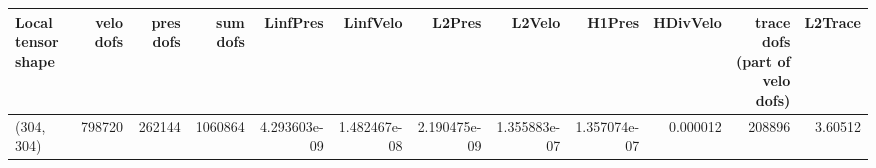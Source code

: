 \begin{tabular}{lrrrrrrrrrrr}
\toprule
Local tensor shape &  velo dofs &  pres dofs &  sum dofs &     LinfPres &     LinfVelo &       L2Pres &       L2Velo &       H1Pres &  HDivVelo &  trace dofs (part of velo dofs) &  L2Trace \\
\midrule
        (304, 304) &     798720 &     262144 &   1060864 & 4.293603e-09 & 1.482467e-08 & 2.190475e-09 & 1.355883e-07 & 1.357074e-07 &  0.000012 &                          208896 &  3.60512 \\
\bottomrule
\end{tabular}
